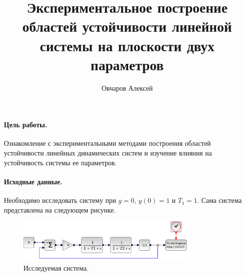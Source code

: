 \documentclass[a4paper, 11pt]{article}
\author{Овчаров Алексей}
\title{Экспериментальное построение областей устойчивости линейной системы на плоскости двух параметров}
\begin{document}
\maketitle

\paragraph{Цель работы.}Ознакомление с экспериментальными методами построения областей устойчивости линейных динамических систем и изучение влияния на устойчивость системы ее параметров.

\paragraph{Исходные данные.} Необходимо исследовать систему при $g = 0$, $y(0) = 1$ и $T_1 = 1$. Сама система представлена на следующем рисунке.
\begin{figure}[h!]
    \centering
    \includegraphics[width = 0.8\textwidth]{images/model.pdf}
    \caption{Исследуемая система.}
\end{figure}
\end{document}
